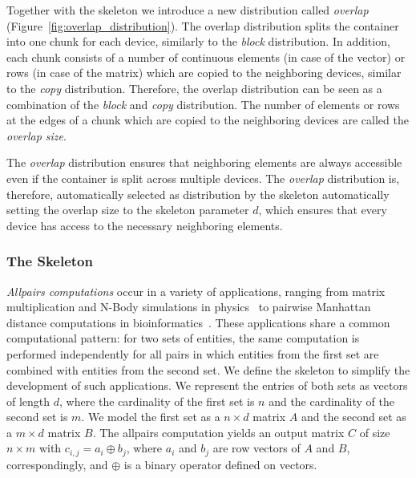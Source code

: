Together with the \stencil skeleton we introduce a new distribution called \emph{overlap} (Figure~\ref{fig:overlap_distribution}).
The overlap distribution splits the container into one chunk for each device, similarly to the \emph{block} distribution.
In addition, each chunk consists of a number of continuous elements (in case of the vector) or rows (in case of the matrix) which are copied to the neighboring devices, similar to the \emph{copy} distribution.
Therefore, the overlap distribution can be seen as a combination of the \emph{block} and \emph{copy} distribution.
The number of elements or rows at the edges of a chunk which are copied to the neighboring devices are called the \emph{overlap size}.

The \emph{overlap} distribution ensures that neighboring elements are always accessible even if the container is split across multiple devices.
The \emph{overlap} distribution is, therefore, automatically selected as distribution by the \stencil skeleton automatically setting the overlap size to the skeleton parameter $d$, which ensures that every device has access to the necessary neighboring elements.





\subsubsection{The \allpairs Skeleton}
\label{sec:allpairs_skeleton}

\emph{Allpairs computations} occur in a variety of applications, ranging from matrix multiplication and N-Body simulations in physics~\cite{AroraShVu2009} to pairwise Manhattan distance computations in bioinformatics~\cite{ChangDeQuRo2009}.
These applications share a common computational pattern:
for two sets of entities, the same computation is performed independently for all pairs in which entities from the first set are combined with entities from the second set.
We define the \allpairs skeleton to simplify the development of such applications.
We represent the entries of both sets as vectors of length $d$, where the cardinality of the first set is $n$ and the cardinality of the second set is $m$.
We model the first set as a $n\times d$ matrix $A$ and the second set as a $m\times d$ matrix $B$.
The allpairs computation yields an output matrix $C$ of size $n\times m$ with $c_{i, j} = a_i \oplus b_j$, where $a_i$ and $b_j$ are row vectors of $A$ and $B$, correspondingly,
and $\oplus$ is a binary operator defined on vectors.

